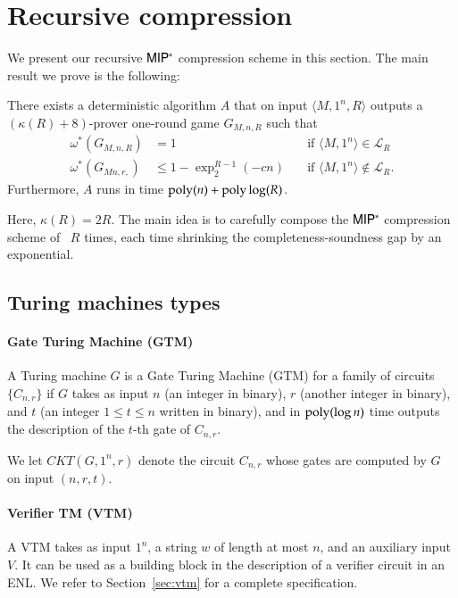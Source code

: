 
\section{Recursive compression}

We present our recursive ${\sf MIP^*}$ compression scheme in this section. The main result we prove is the following:

\begin{theorem}
	There exists a deterministic algorithm $A$ that on input $\langle M, 1^n, R \rangle$ outputs a $(\kappa(R) + 8)$-prover one-round game $G_{M,n,R}$ such that 
\begin{align*}
		\omega^*(G_{M,n,R}) &= 1  \quad & \text{if } \langle M,1^n \rangle\in \mathcal{L}_R \\
		\omega^*(G_{Mn,r,}) &\leq 1 - \exp^{R-1}_2(-cn) \quad &\text{if } \langle M,1^n \rangle\notin \mathcal{L}_R.
\end{align*}
Furthermore, $A$ runs in time $\operatorname{poly}(n) + \operatorname{poly}\log(R)$.	
\end{theorem}

Here, $\kappa(R) = 2R$.  The main idea is to carefully compose the ${\sf MIP^*}$ compression scheme of~\cite{ji2016compression} $R$ times, each time shrinking the completeness-soundness gap by an exponential. 

\subsection{Turing machines types}

\paragraph{Gate Turing Machine (GTM)} A Turing machine $G$ is a Gate Turing Machine (GTM) for a family of circuits $\{C_{n,r}\}$ if $G$ takes as input $n$ (an integer in binary), $r$ (another integer in binary), and $t$ (an integer $1\leq t\leq n$ written in binary), and in $\operatorname{poly}(\log n)$ time outputs the description of the $t$-th gate of $C_{n,r}$. 

We let $CKT(G,1^n,r)$ denote the circuit $C_{n,r}$ whose gates are computed by $G$ on input $(n,r,t)$.

\paragraph{Verifier TM (VTM)} A VTM takes as input $1^n$, a string $w$ of length at most $n$, and an auxiliary input $V$. %
It can be used as a building block in the description of a verifier circuit in an ENL. We refer to Section~\ref{sec:vtm} for a complete specification. 


